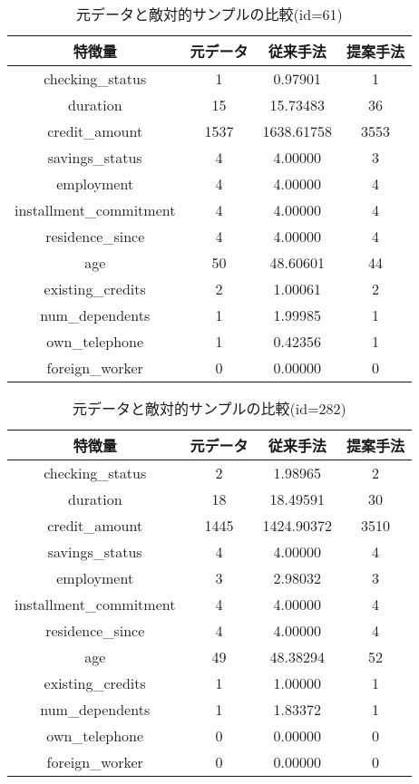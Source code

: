 \begin{table}[H]
    \centering
    \caption{元データと敵対的サンプルの比較(id=61)}
    \begin{tabular}{|c|c|c|c|} \hline
        特徴量 & 元データ & 従来手法 & 提案手法 \\ \hline
        checking\_status & 1 & 0.97901 & 1 \\ \hline
        duration & 15 & 15.73483 & 36 \\ \hline
        credit\_amount & 1537 & 1638.61758 & 3553 \\ \hline
        savings\_status & 4 & 4.00000 & 3 \\ \hline
        employment & 4 & 4.00000 & 4 \\ \hline
        installment\_commitment & 4 & 4.00000 & 4 \\ \hline
        residence\_since & 4 & 4.00000 & 4 \\ \hline
        age & 50 & 48.60601 & 44 \\ \hline
        existing\_credits & 2 & 1.00061 & 2 \\ \hline
        num\_dependents & 1 & 1.99985 & 1 \\ \hline
        own\_telephone & 1 & 0.42356 & 1 \\ \hline
        foreign\_worker & 0 & 0.00000 & 0 \\ \hline
    \end{tabular}
\end{table}

\begin{table}[H]
    \centering
    \caption{元データと敵対的サンプルの比較(id=282)}
    \begin{tabular}{|c|c|c|c|} \hline
        特徴量 & 元データ & 従来手法 & 提案手法 \\ \hline
        checking\_status & 2 & 1.98965 & 2 \\ \hline
        duration & 18 & 18.49591 & 30 \\ \hline
        credit\_amount & 1445 & 1424.90372 & 3510 \\ \hline
        savings\_status & 4 & 4.00000 & 4 \\ \hline
        employment & 3 & 2.98032 & 3 \\ \hline
        installment\_commitment & 4 & 4.00000 & 4 \\ \hline
        residence\_since & 4 & 4.00000 & 4 \\ \hline
        age & 49 & 48.38294 & 52 \\ \hline
        existing\_credits & 1 & 1.00000 & 1 \\ \hline
        num\_dependents & 1 & 1.83372 & 1 \\ \hline
        own\_telephone & 0 & 0.00000 & 0 \\ \hline
        foreign\_worker & 0 & 0.00000 & 0 \\ \hline
    \end{tabular}
\end{table}

